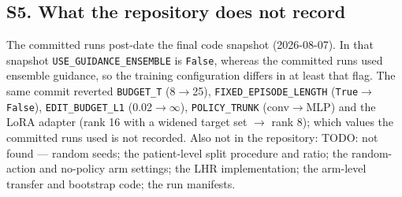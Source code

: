 \subsection*{S5. What the repository does not record}

The committed runs post-date the final code snapshot (2026-08-07). In that snapshot \texttt{USE\_GUIDANCE\_ENSEMBLE} is \texttt{False}, whereas the committed runs used ensemble guidance, so the training configuration differs in at least that flag. The same commit reverted \texttt{BUDGET\_T} (8$\to$25), \texttt{FIXED\_EPISODE\_LENGTH} (\texttt{True}$\to$\texttt{False}), \texttt{EDIT\_BUDGET\_L1} (0.02$\to\infty$), \texttt{POLICY\_TRUNK} (conv$\to$MLP) and the LoRA adapter (rank 16 with a widened target set $\to$ rank 8); which values the committed runs used is not recorded. Also not in the repository: TODO: not found --- random seeds; the patient-level split procedure and ratio; the random-action and no-policy arm settings; the LHR implementation; the arm-level transfer and bootstrap code; the run manifests.
